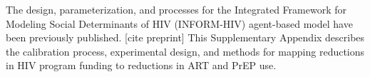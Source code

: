 \documentclass[preprint,12pt]{elsarticle}
\begin{document}

The design, parameterization, and processes for the Integrated Framework for Modeling Social Determinants of HIV (INFORM-HIV) agent-based model have been previously published. [cite preprint] This Supplementary Appendix describes the calibration process, experimental design, and methods for mapping reductions in HIV program funding to reductions in ART and PrEP use. 




\end{document}
